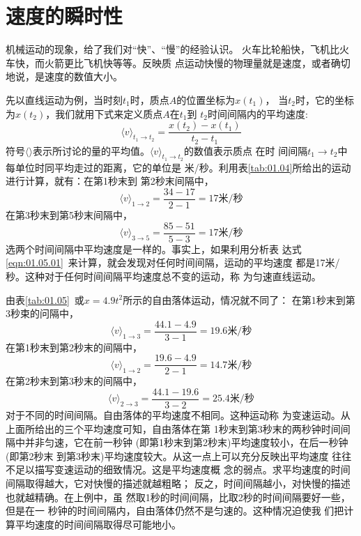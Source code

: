\section{速度的瞬时性}\label{sec:01.06}

机械运动的现象，给了我们对“快”、“慢”的经验认识。
火车比轮船快，飞机比火车快，而火箭更比飞机快等等。反映质
点运动快慢的物理量就是速度，或者确切地说，是速度的数值大小。

先以直线运动为例，当时刻$ t_1 $时，质点$ A $的位置坐标为$ x(t_1) $，
当$ t_2 $时，它的坐标为$ x(t_2) $，我们就用下式来定义质点$ A $在$ t_1 $到
$ t_2 $时间间隔内的平均速度:
\begin{equation}
    \langle v\rangle_{t_{1} \rightarrow t_{2}}=\frac{x(t_{2})-x(t_{1})}{t_{2}-t_{1}} \label{eqn:01.06.01}
\end{equation}
符号$\langle \rangle$表示所讨论的量的平均值。$\langle v\rangle_{t_{1} \rightarrow t_{2}}$的数值表示质点
在时
\clearpage
\noindent 间间隔$t_{1} \rightarrow t_{2}$中每单位时同平均走过的距离，它的单位是
米/秒。利用表\ref{tab:01.04}所给出的运动进行计算，就有：在第1秒末到
第2秒末间隔中，
\begin{equation*}
    \langle v\rangle_{1 \rightarrow 2}=\frac{34-17}{2-1}=17\text{米/秒}
\end{equation*}
在第3秒末到第5秒末间隔中，
\begin{equation*}
    \langle v\rangle_{3 \rightarrow 5}=\frac{85-51}{5-3}=17\text{米/秒}
\end{equation*}
选两个时间间隔中平均速度是一样的。事实上，如果利用分析表
达式\eqref{eqn:01.05.01}~来计算，就会发现对任何时间间隔，运动的平均速度
都是17米/秒。这种对于任何时间间隔平均速度总不变的运动，称
为匀速直线运动。

由表\ref{tab:01.05}~或$x=4.9t^2$所示的自由落体运动，情况就不同了：
在第1秒末到第3秒束的问隔中，
\begin{equation*}
    \langle v\rangle_{1 \rightarrow 3}=\frac{44.1-4.9}{3-1}=19.6\text{米/秒}
\end{equation*}
在第1秒末到第2秒末的间隔中，
\begin{equation*}
    \langle v\rangle_{1 \rightarrow 2}=\frac{19.6-4.9}{2-1}=14.7\text{米/秒}
\end{equation*}
在第2秒末到第3秒末的间隔中，
\begin{equation*}
    \langle v\rangle_{2 \rightarrow 3}=\frac{44.1-19.6}{3-2}=25.4\text{米/秒}
\end{equation*}
对于不同的时间间隔。自由落体的平均速度不相同。这种运动称
为变速运动。从上面所给出的三个平均速度可知，自由落体在第
1秒末到第3秒末的两秒钟时间间隔中并非匀速，它在前一秒钟
(即第1秒末到第2秒末)平均速度较小，在后一秒钟(即第2秒末
到第3秒末)平均速度较大。从这一点上可以充分反映出平均速度
往往不足以描写变速运动的细致情况。这是平均速度概
念的弱点。求平均速度的时间间隔取得越大，它对快慢的描述就越粗略；
反之，时间间隔越小，对快慢的描述也就越精确。在上例中，虽
然取1秒的时间间隔，比取2秒的时间间隔要好一些，但是在一
秒钟的时间间隔内，自由落体仍然不是匀速的。这种情况迫使我
们把计算平均速度的时间间隔取得尽可能地小。

